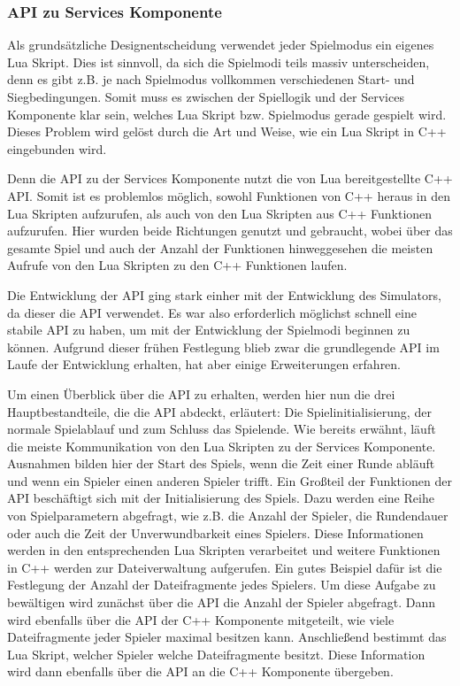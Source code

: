 \subsubsection{API zu Services Komponente}
\label{sec:api-zu-services-komponente}

Als grundsätzliche Designentscheidung verwendet jeder Spielmodus ein eigenes Lua Skript.
Dies ist sinnvoll, da sich die Spielmodi teils massiv unterscheiden, denn es gibt z.B. je nach
Spielmodus vollkommen verschiedenen Start- und Siegbedingungen. Somit muss es
zwischen der Spiellogik und der Services Komponente klar sein, welches Lua Skript bzw.
Spielmodus gerade gespielt wird. Dieses Problem wird gelöst durch die Art und Weise, wie
ein Lua Skript in C++ eingebunden wird.

Denn die API zu der Services Komponente nutzt die von Lua bereitgestellte C++ API. Somit
ist es problemlos möglich, sowohl Funktionen von C++ heraus in den Lua Skripten
aufzurufen, als auch von den Lua Skripten aus C++ Funktionen aufzurufen. Hier wurden
beide Richtungen genutzt und gebraucht, wobei über das gesamte Spiel und auch der
Anzahl der Funktionen hinweggesehen die meisten Aufrufe von den Lua Skripten zu den C++ Funktionen laufen.

Die Entwicklung der API ging stark einher mit der Entwicklung des Simulators, da dieser die
API verwendet. Es war also erforderlich möglichst schnell eine stabile API zu haben, um mit
der Entwicklung der Spielmodi beginnen zu können. Aufgrund dieser frühen Festlegung
blieb zwar die grundlegende API im Laufe der Entwicklung erhalten, hat aber einige
Erweiterungen erfahren.

Um einen Überblick über die API zu erhalten, werden hier nun die drei Hauptbestandteile,
die die API abdeckt, erläutert: Die Spielinitialisierung, der normale Spielablauf und zum
Schluss das Spielende.
Wie bereits erwähnt, läuft die meiste Kommunikation von den Lua Skripten zu der Services
Komponente. Ausnahmen bilden hier der Start des Spiels, wenn die Zeit einer Runde abläuft
und wenn ein Spieler einen anderen Spieler trifft. Ein Großteil der Funktionen der API
beschäftigt sich mit der Initialisierung des Spiels. Dazu werden eine Reihe von
Spielparametern abgefragt, wie z.B. die Anzahl der Spieler, die Rundendauer oder auch die
Zeit der Unverwundbarkeit eines Spielers. Diese Informationen werden in den
entsprechenden Lua Skripten verarbeitet und weitere Funktionen in C++ werden zur
Dateiverwaltung aufgerufen.
Ein gutes Beispiel dafür ist die Festlegung der Anzahl der Dateifragmente jedes Spielers.
Um diese Aufgabe zu bewältigen wird zunächst über die API die Anzahl der Spieler
abgefragt. Dann wird ebenfalls über die API der C++ Komponente mitgeteilt, wie viele
Dateifragmente jeder Spieler maximal besitzen kann. Anschließend bestimmt das Lua
Skript, welcher Spieler welche Dateifragmente besitzt. Diese Information wird dann
ebenfalls über die API an die C++ Komponente übergeben.

